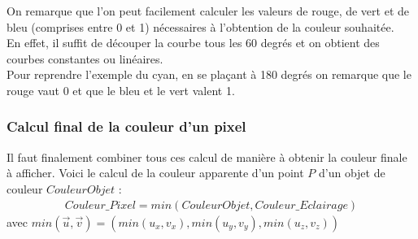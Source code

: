 On remarque que l'on peut facilement calculer les valeurs de rouge, de vert et de bleu (comprises entre 0 et 1) nécessaires à l'obtention de la couleur souhaitée.\\
En effet, il suffit de découper la courbe tous les 60 degrés et on obtient des courbes constantes ou linéaires.\\
Pour reprendre l'exemple du cyan, en se plaçant à 180 degrés on remarque que le rouge vaut 0 et que le bleu et le vert valent 1.


\subsubsection{Calcul final de la couleur d'un pixel}
Il faut finalement combiner tous ces calcul de manière à obtenir la couleur finale à afficher. Voici le calcul de la couleur apparente d'un point $P$ d'un objet de couleur $CouleurObjet$ :
\begin{align*}
    Couleur\_Pixel=min(CouleurObjet,Couleur\_Eclairage)%
\end{align*}
avec $min(\Vec{u},\Vec{v})=(min(u_x,v_x),min(u_y,v_y),min(u_z,v_z))$